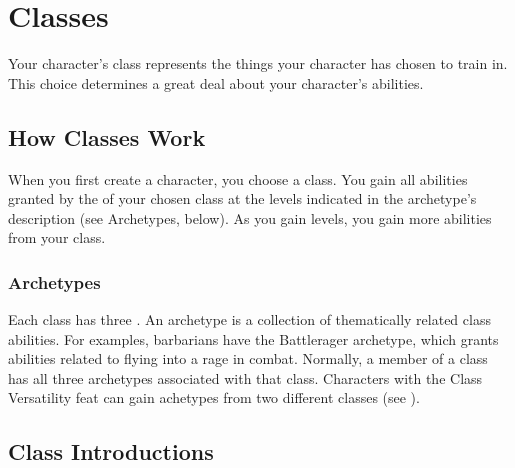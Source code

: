 \chapter{Classes}\label{Classes}

Your character's class represents the things your character has chosen to train in.
This choice determines a great deal about your character's abilities.

\section{How Classes Work}
    When you first create a character, you choose a class.
    You gain all abilities granted by the  of your chosen class at the levels indicated in the archetype's description (see Archetypes, below).
    As you gain levels, you gain more abilities from your class.

    \subsection{Archetypes}\label{Archetypes}
        Each class has three .
        An archetype is a collection of thematically related class abilities.
        For examples, barbarians have the Battlerager archetype, which grants abilities related to flying into a rage in combat.
        Normally, a member of a class has all three archetypes associated with that class.
        Characters with the Class Versatility feat can gain achetypes from two different classes (see ).

\section{Class Introductions}

